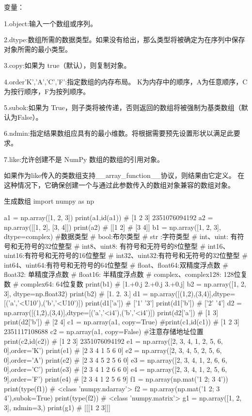 \documentclass[11pt]{article}
\begin{document}
变量：

1.object:输入一个数组或序列。

2.dtype:数组所需的数据类型。如果没有给出，那么类型将被确定为在序列中保存对象所需的最小类型。

3.copy:如果为 true（默认），则复制对象。

4.order{'K','A','C','F'}:指定数组的内存布局。
K为内存中的顺序，A为任意顺序，C为按行顺序，F为按列顺序。

5.subok:如果为 True，则子类将被传递，否则返回的数组将被强制为基类数组（默认为False）。

6.ndmin:指定结果数组应具有的最小维数。将根据需要预先设置形状以满足此要求。

7.like:允许创建不是 NumPy 数组的数组的引用对象。

如果作为like传入的类数组支持\_\_array\_function\_\_协议，则结果由它定义。
在这种情况下，它确保创建一个与通过此参数传入的数组对象兼容的数组对象。
\begin{Python}{生成数组}
import numpy as np

a1 = np.array([1, 2, 3])
print(a1,id(a1))
#   [1 2 3] 2351076094192
a2 = np.array([[1, 2], [3, 4]])
print(a2)
#   [[1 2]
#    [3 4]]
b1 = np.array([1, 2, 3], dtype=complex)
#数据类型
#   bool:布尔类型
#   str :字符类型
#   int、uint:    有符号和无符号的32位整型
#   int8、uint8:  有符号和无符号的8位整型
#   int16、uint16:有符号和无符号的16位整型
#   int32、uint32:有符号和无符号的32位整型
#   int64、uint64:有符号和无符号的64位整型
#   float、float64:双精度浮点数
#   float32: 单精度浮点数
#   float16: 半精度浮点数
#   complex、complex128: 128位复数
#   complex64:    64位复数
print(b1)
#   [1.+0.j 2.+0.j 3.+0.j]
b2 = np.array([1, 2, 3], dtype=np.float32)
print(b2)
#   [1. 2. 3.]
d1 = np.array([(1,2),(3,4)],dtype=[('a','<U10'),('b','<U10')])
print(d1['a'])
#   ['1' '3']
print(d1['b'])
#   ['2' '4']
d2 = np.array([(1,2),(3,4)],dtype=[('a','<i4'),('b','<i4')])
print(d2['a'])
#   [1 3]
print(d2['b'])
#   [2 4]
c1 = np.array(a1, copy=True)
#print(c1,id(c1))
#   [1 2 3] 2351117108688
c2 = np.array(a1, copy=False)   #注意存储地址位置
print(c2,id(c2))
#   [1 2 3] 2351076094192
e1 = np.array([2, 3, 4, 1, 2, 5, 6, 0],order='K')
print(e1)
#   [2 3 4 1 5 6 0]
e2 = np.array([2, 3, 4, 5, 2, 5, 6, 0],order='A')
print(e2)
#   [2 3 4 5 2 5 6 0]
e3 = np.array([2, 3, 4, 1, 2, 6, 6, 0],order='C')
print(e3)
#   [2 3 4 1 2 6 6 0]
e4 = np.array([2, 3, 4, 1, 2, 5, 6, 9],order='F')
print(e4)
#   [2 3 4 1 2 5 6 9]
f1 = np.array(np.mat('1 2; 3 4'))
print(type(f1))
#   <class 'numpy.ndarray'>
f2 = np.array(np.mat('1 2; 3 4'),subok=True)
print(type(f2))
#   <class 'numpy.matrix'>
g1 = np.array([1, 2, 3], ndmin=3,)
print(g1)
#   [[[1 2 3]]]
\end{Python}
\end{document}
